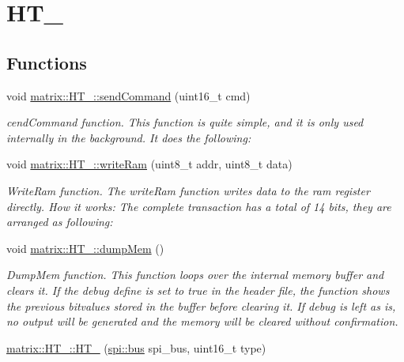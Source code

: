 \hypertarget{group___h_t__1632}{}\section{H\+T\+\_}
\label{group___h_t__1632}
\subsection*{Functions}
\begin{DoxyCompactItemize}
\item 
void \hyperlink{group___h_t__1632_ga4e49c60cb79e44ba9f67d33c1986b5e6}{matrix\+::\+H\+T\+\_\+::send\+Command} (uint16\+\_\+t cmd)
\begin{DoxyCompactList}\small\item\em cend\+Command function. This function is quite simple, and it is only used internally in the background. It does the following\+: \end{DoxyCompactList}\item 
void \hyperlink{group___h_t__1632_gac3d327b762c8245ddc6f88ba26c46e82}{matrix\+::\+H\+T\+\_\+::write\+Ram} (uint8\+\_\+t addr, uint8\+\_\+t data)
\begin{DoxyCompactList}\small\item\em Write\+Ram function. The write\+Ram function writes data to the ram register directly. How it works\+: The complete transaction has a total of 14 bits, they are arranged as following\+: \end{DoxyCompactList}\item 
\mbox{\label{group___h_t__1632_ga7125530a962e17d9a533453e10d19e15}} 
void \hyperlink{group___h_t__1632_ga7125530a962e17d9a533453e10d19e15}{matrix\+::\+H\+T\+\_\+::dump\+Mem} ()
\begin{DoxyCompactList}\small\item\em Dump\+Mem function. This function loops over the internal memory buffer and clears it. If the \textquotesingle{}debug\textquotesingle{} define is set to true in the header file, the function shows the previous bitvalues stored in the buffer before clearing it. If debug is left as is, no output will be generated and the memory will be cleared without confirmation. \end{DoxyCompactList}\item 
\hyperlink{group___h_t__1632_ga6f2a79fd8a1be6e44b847d8548962400}{matrix\+::\+H\+T\+\_\+::\+H\+T\+\_} (\hyperlink{classspi_1_1bus}{spi\+::bus} spi\+\_\+bus, uint16\+\_\+t type)

\end{DoxyCompactItemize}
